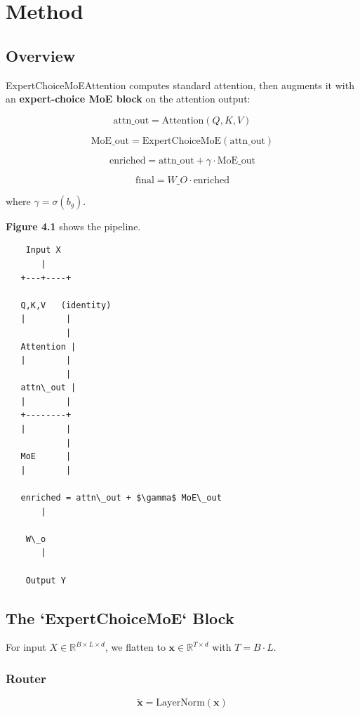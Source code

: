 \section{Method}

\subsection{Overview}

ExpertChoiceMoEAttention computes standard attention, then augments it with 
an \textbf{expert-choice MoE block} on the attention output:

\[
\text{attn\_out} = \text{Attention}(Q, K, V)
\tag{4.1}
\]

\[
\text{MoE\_out} = \text{ExpertChoiceMoE}(\text{attn\_out})
\tag{4.2}
\]

\[
\text{enriched} = \text{attn\_out} + \gamma \cdot \text{MoE\_out}
\tag{4.3}
\]

\[
\text{final} = W\_O \cdot \text{enriched}
\tag{4.4}
\]

where $\gamma = \sigma(b_g)$.

\textbf{Figure 4.1} shows the pipeline.

\begin{lstlisting}
    Input X
       |
   +---+----+
             
   Q,K,V   (identity)
   |        |
            |
   Attention |
   |        |
            |
   attn\_out |
   |        |
   +--------+
   |        |
            |
   MoE      |
   |        |
             
   enriched = attn\_out + $\gamma$ MoE\_out
       |
        
    W\_o
       |
        
    Output Y
\end{lstlisting}

\subsection{The `ExpertChoiceMoE` Block}

For input $X \in \mathbb{R}^{B \times L \times d}$, we flatten to 
$\mathbf{x} \in \mathbb{R}^{T \times d}$ with $T = B \cdot L$.

\subsubsection{Router}

\[
\tilde{\mathbf{x}} = \text{LayerNorm}(\mathbf{x})
\tag{4.5}
\]

